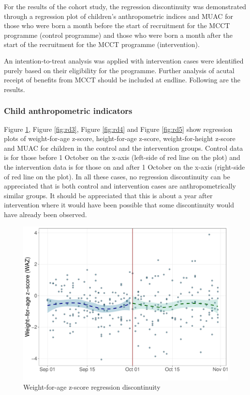 \documentclass[12pt,a4paper]{article}
\begin{document}
For the results of the cohort study, the regression discontinuity was demonstrated through a regression plot of children's anthropometric indices and MUAC for those who were born a month before the start of recruitment for the MCCT programme (control programme) and those who were born a month after the start of the recruitment for the MCCT programme (intervention).

An intention-to-treat analysis was applied with intervention cases were identified purely based on their eligibility for the programme. Further analysis of acutal receipt of benefits from MCCT should be included at endline. Following are the results.

\hypertarget{child-anthropometric-indicators}{%
\subsubsection{Child anthropometric indicators}\label{child-anthropometric-indicators}}

Figure \ref{fig:rd2}, Figure \ref{fig:rd3}, Figure \ref{fig:rd4} and Figure \ref{fig:rd5} show regression plots of weight-for-age z-score, height-for-age z-score, weight-for-height z-score and MUAC for children in the control and the intervention groups. Control data is for those before 1 October on the x-axis (left-side of red line on the plot) and the intervention data is for those on and after 1 October on the x-axis (right-side of red line on the plot). In all these cases, no regression discontinuity can be appreciated that is both control and intervention cases are anthropometrically similar groups. It should be appreciated that this is about a year after intervention where it would have been possible that some discontinuity would have already been observed.

\begin{figure}[H]

{\centering \includegraphics{kayinReport_files/figure-latex/rd2-1} 

}

\caption{Weight-for-age z-score regression discontinuity}\label{fig:rd2}
\end{figure}
\end{document}
